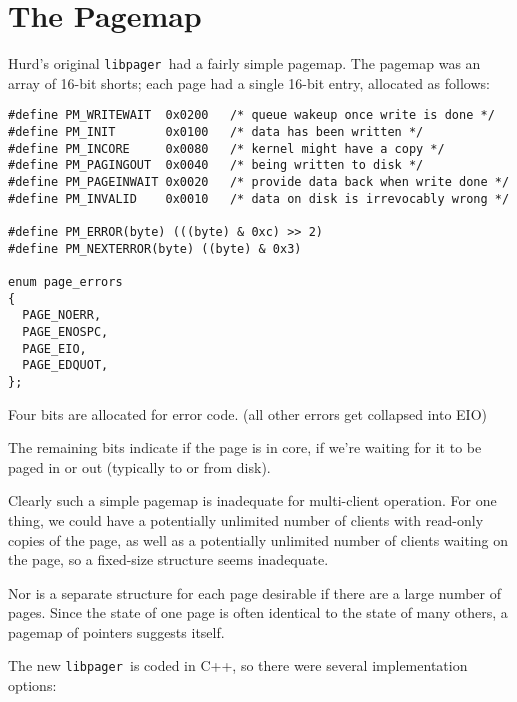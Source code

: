 \documentclass{article}
\def\libpager{{\tt libpager\ }}
\begin{document}
\section{The Pagemap}

Hurd's original \libpager had a fairly simple pagemap.  The pagemap was
an array of 16-bit shorts; each page had a single 16-bit entry, allocated
as follows:

\begin{verbatim}
#define PM_WRITEWAIT  0x0200   /* queue wakeup once write is done */
#define PM_INIT       0x0100   /* data has been written */
#define PM_INCORE     0x0080   /* kernel might have a copy */
#define PM_PAGINGOUT  0x0040   /* being written to disk */
#define PM_PAGEINWAIT 0x0020   /* provide data back when write done */
#define PM_INVALID    0x0010   /* data on disk is irrevocably wrong */

#define PM_ERROR(byte) (((byte) & 0xc) >> 2)
#define PM_NEXTERROR(byte) ((byte) & 0x3)

enum page_errors
{
  PAGE_NOERR,
  PAGE_ENOSPC,
  PAGE_EIO,
  PAGE_EDQUOT,
};
\end{verbatim}

Four bits are allocated for error code.  (all other errors get collapsed into EIO)

The remaining bits indicate if the page is in core, if we're waiting
for it to be paged in or out (typically to or from disk).

Clearly such a simple pagemap is inadequate for multi-client
operation.  For one thing, we could have a potentially unlimited
number of clients with read-only copies of the page, as well as a
potentially unlimited number of clients waiting on the page, so
a fixed-size structure seems inadequate.

Nor is a separate structure for each page desirable if there are
a large number of pages.  Since the state of one page is often
identical to the state of many others, a pagemap of pointers
suggests itself.

The new \libpager is coded in C++, so there were several implementation options:
\end{document}
